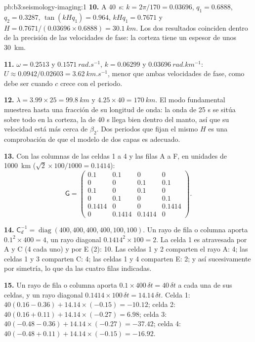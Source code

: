 \begin{solution}{pb:b3:seismology-imaging:1}
\textbf{10.} A \qty{40}{s}: $k = 2\pi/170 = 0.03696$, $q_1 = 0.6888$,
$q_2 = 0.3287$, $\tan(kHq_1) = 0.964$, $kHq_1 = 0.7671$ y
$H = 0.7671/(0.03696\times0.6888) = \qty{30.1}{km}$. Los dos resultados coinciden dentro de la
precisión de las velocidades de fase: la corteza tiene un espesor de unos \qty{30}{km}.

\textbf{11.} $\omega = 0.2513$ y $\qty{0.1571}{rad.s^{-1}}$, $k = 0.06299$ y
$\qty{0.03696}{rad.km^{-1}}$: $U \approx 0.0942/0.02603 = \qty{3.62}{km.s^{-1}}$,
menor que ambas velocidades de fase, como debe ser cuando $c$ crece con el
periodo.

\textbf{12.} $\lambda = 3.99\times25 = \qty{99.8}{km}$ y $4.25\times40 =
\qty{170}{km}$. El modo fundamental muestrea hasta una fracción de su
longitud de onda: la onda de 25 s se sitúa sobre todo en la corteza, la de 40 s llega bien
dentro del manto, así que su velocidad está más cerca de $\beta_2$. Dos periodos que fijan el
mismo $H$ es una comprobación de que el modelo de dos capas es adecuado.

\textbf{13.} Con las columnas de las celdas 1 a 4 y las filas A a F, en unidades
de \qty{1000}{km} ($\sqrt2\times100/1000 = 0.1414$):
\[
  \mathsf G = \begin{pmatrix}
  0.1 & 0.1 & 0 & 0 \\ 0 & 0 & 0.1 & 0.1 \\ 0.1 & 0 & 0.1 & 0 \\
  0 & 0.1 & 0 & 0.1 \\ 0.1414 & 0 & 0 & 0.1414 \\ 0 & 0.1414 & 0.1414 & 0
  \end{pmatrix}.
\]

\textbf{14.} $\mathsf C_d^{-1} = \operatorname{diag}(400, 400, 400, 400, 100,
100)$. Un rayo de fila o columna aporta $0.1^2\times400 = 4$, un rayo diagonal
$0.1414^2\times100 = 2$. La celda 1 es atravesada por A y C (4 cada uno) y por E (2): 10. Las celdas
1 y 2 comparten el rayo A: 4; las celdas 1 y 3 comparten C: 4; las celdas 1 y 4 comparten E: 2; y
así sucesivamente por simetría, lo que da las cuatro filas indicadas.

\textbf{15.} Un rayo de fila o columna aporta $0.1\times400\,\delta t = 40\,
\delta t$ a cada una de sus celdas, y un rayo diagonal $0.1414\times100\,\delta t =
14.14\,\delta t$. Celda 1: $40(0.16 - 0.36) + 14.14\times(-0.15) = -10.12$; celda
2: $40(0.16 + 0.11) + 14.14\times(-0.27) = 6.98$; celda 3: $40(-0.48 - 0.36) +
14.14\times(-0.27) = -37.42$; celda 4: $40(-0.48 + 0.11) + 14.14\times(-0.15) =
-16.92$.


\end{solution}
